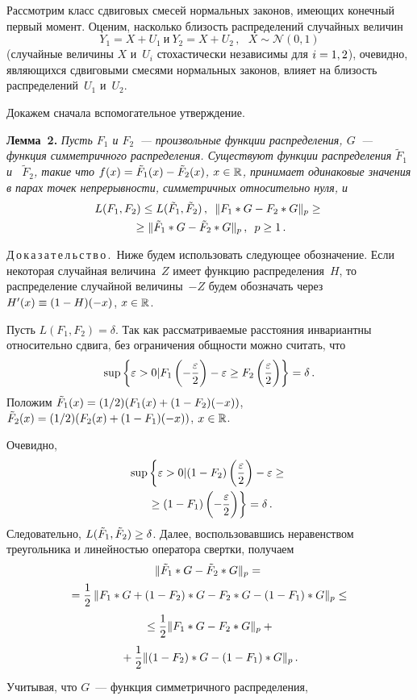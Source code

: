 \begin{multicols}{2}
Рассмотрим класс сдвиговых смесей нормальных законов, имеющих
конечный первый момент. Оценим, насколько близость распределений
случайных величин
$$
Y_1= X+U_1 \ \mbox{и} \  Y_2= X+U_2\,, \ \ \  X\sim\mathcal{N}(0,1)
$$
(случайные величины $X$ и~$U_i$ стохастически независимы для
$i\hm=1,2$), очевидно, являющихся сдвиговыми смесями нормальных
законов, влияет на близость распределений~$U_1$ и~$U_2$.

Докажем сначала вспомогательное утверждение.

\medskip

\noindent
\textbf{Лемма~2.}
\textit{Пусть  $F_1$ и  $F_2$~--- произвольные функции распределения, $G$~---
функция симметричного распределения. Существуют функции
распределения  $\tilde F_1$ и~ $\tilde F_2$, такие что $f(x) \hm=
\tilde F_1(x) \hm- \tilde F_2(x)$, $x \hm\in \mathbb{R}$,  принимает
одинаковые значения в парах точек непрерывности, симметричных
относительно нуля, и}
\begin{multline*}
L(F_1,F_2) \le L(\tilde F_1,\tilde F_2)\,,  \enskip
\|
F_1*G - F_2*G \|_{p} \ge{}\\
{}\ge \|
\tilde F_1*G - \tilde F_2*G
\|_{p}\,,  \enskip p\ge1\,.
\end{multline*}



\noindent
Д\,о\,к\,а\,з\,а\,т\,е\,л\,ь\,с\,т\,в\,о\,.\ 
Ниже будем использовать следующее обозначение. Если некоторая
случайная величина~$Z$ имеет функцию распределения~$H$, то
распределение случайной величины~$-Z$ будем обозначать через
$H'(x)\hm\equiv(1 - H)(-x)$, $x \hm\in \mathbb{R}$.

Пусть $L(F_1,F_2) = \delta$. Так как рассматриваемые расстояния
инвариантны относительно сдвига, без ограничения общности можно считать, что
$$
\sup \left\{ \varepsilon > 0 |
F_1\left(- \displaystyle\frac{\displaystyle \varepsilon\mathstrut}{\displaystyle 2\mathstrut}  \right) - \varepsilon \geq F_2\left(
\displaystyle\frac{\displaystyle \varepsilon\mathstrut}{\displaystyle 2\mathstrut} \right)  \right\} = \delta\,.
$$
Положим 
$\tilde F_1(x) \hm= (1/2)(F_1(x)  \hm+ (1 - F_2)(-x))$, 
$\tilde F_2(x) \hm= (1/2)(F_2(x) \hm + (1 - F_1)(-x))$, 
$x \hm\in \mathbb{R}$.

Очевидно,
\begin{multline*}
\sup \left\{ \varepsilon > 0 |
(1 - F_2)\left( \displaystyle\frac{\displaystyle \varepsilon\mathstrut}{\displaystyle 2\mathstrut}  \right) - \varepsilon \geq {}\right.\\
\left.{}\geq(1 - F_1)\left(
-\displaystyle\frac{\displaystyle \varepsilon\mathstrut}{\displaystyle 2\mathstrut} \right)  \right\} =
 \delta\,.
\end{multline*}
Следовательно, $L(\tilde F_1,\tilde F_2) \hm\ge \delta$. Далее,
воспользовавшись неравенством треугольника и линейностью оператора
свертки, получаем
\begin{multline}
\|
\tilde F_1*G - \tilde F_2*G
\|_{p}  ={}\\
{}=
 \displaystyle\frac{\displaystyle 1\mathstrut}{\displaystyle 2\mathstrut}\,
\|
 F_1*G  + (1-F_2)*G  -  F_2 * G - (1-F_1) * G
\|_{p}\le{}\\
{}\le
\displaystyle\frac{\displaystyle 1\mathstrut}{\displaystyle 2\mathstrut}\|
 F_1*G    -  F_2 * G
\|_{p}+{}\\
{}+\displaystyle\frac{\displaystyle 1\mathstrut}{\displaystyle 2\mathstrut}\|
 (1-F_2) * G  - (1-F_1)*G
\|_{p}\,.
\label{symmetrLemm}
\end{multline}
Учитывая, что $G$~--- функция симметричного распределения,


\end{multicols}
